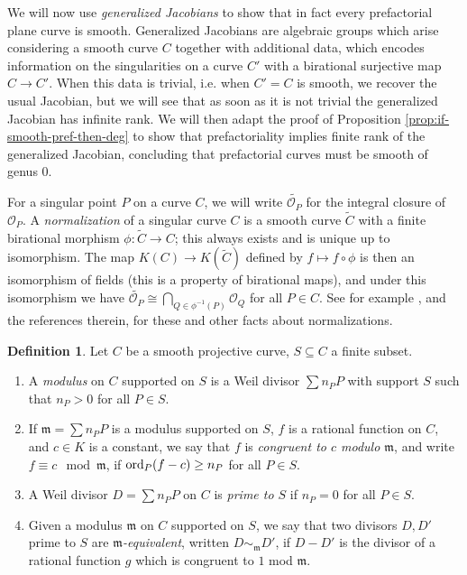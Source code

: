 \documentclass{amsart}
\theoremstyle{plain}
\theoremstyle{definition}
\newtheorem{defn}[thm]{Definition}
\newcommand{\ord}{\textnormal{ord}}
\begin{document}
 We will now use \emph{generalized Jacobians} to show that in fact every prefactorial plane curve is smooth. Generalized Jacobians are algebraic groups which arise considering a smooth curve $C$ together with additional data, which encodes information on the singularities on a curve $C'$ with a birational surjective map $C \to C'$. When this data is trivial, i.e$.$ when $C'=C$ is smooth, we recover the usual Jacobian, but we will see that as soon as it is not trivial the generalized Jacobian has infinite rank. We will then adapt the proof of Proposition \ref{prop:if-smooth-pref-then-deg} to show that prefactoriality implies finite rank of the generalized Jacobian, concluding that prefactorial curves must be smooth of genus 0. 

For a singular point $P$ on a curve $C$, we will write $\widetilde{\mathcal{O}_P}$ for the integral closure of $\mathcal{O}_P$. A \emph{normalization} of a singular curve $C$ is a smooth curve $\tilde{C}$ with a finite birational morphism $\phi: \tilde{C} \rightarrow C$; this always exists and is unique up to isomorphism. The map $K(C) \rightarrow K(\tilde{C})$ defined by $f \mapsto f \circ \phi$ is then an isomorphism of fields (this is a property of birational maps), and under this isomorphism we have $\widetilde{\mathcal{O}_P} \cong \bigcap_{Q \in \phi^{-1}(P)} \mathcal{O}_Q$ for all $P \in C$. See for example \cite[Ch.~IV.1]{Serre}, and the references therein, for these and other facts about normalizations.

\begin{defn}
	Let $C$ be a smooth projective curve, $S \subseteq C$ a finite subset. 
	\begin{enumerate}
		\item A \emph{modulus} on $C$ supported on $S$ is a Weil divisor $\sum n_P P$ with support $S$ such that $n_P >0$ for all $P \in S$.
		\item If $\mathfrak{m} = \sum n_P P$ is a modulus supported on $S$, $f$ is a rational function on $C$, and $c \in K$ is a constant, we say that $f$ is \emph{congruent to $c$ modulo $\mathfrak{m}$}, and write $f \equiv c \mod \mathfrak{m}$, if $\ord_P(f-c) \geq n_P$ for all $P \in S$.
		\item A Weil divisor $D=\sum n_P P$ on $C$ is \emph{prime to $S$} if $n_P=0$ for all $P \in S$. 
		\item Given a modulus $\mathfrak m$ on $C$ supported on $S$, we say that two divisors $D,D'$ prime to $S$ are \emph{$\mathfrak{m}$-equivalent}, written $D \sim_{\mathfrak{m}} D'$, if $D-D'$ is the divisor of a rational function $g$ which is congruent to $1$ mod $\mathfrak{m}$.
	\end{enumerate} 
\end{defn}
\end{document}
